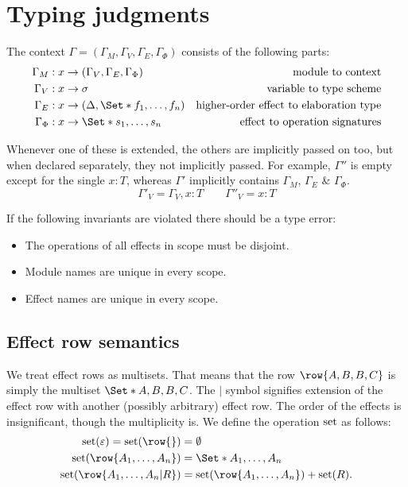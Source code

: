 \section{Typing judgments}

The context $\Gamma = (\Gamma_M, \Gamma_V, \Gamma_E, \Gamma_\Phi)$ consists of the following parts:
\begin{align*}
    \Gamma_M &: x \to (\Gamma_V, \Gamma_E, \Gamma_\Phi) & \text{module to context}\\
    \Gamma_V &: x \to \sigma & \text{variable to type scheme}\\
    \Gamma_E &: x \to (\Delta, \S{f_1, \dots, f_n}) & \text{higher-order effect to elaboration type}\\
    \Gamma_\Phi &: x \to \S{s_1,\dots,s_n} & \text{effect to operation signatures}
\end{align*}


Whenever one of these is extended, the others are implicitly passed on too, but when declared separately, they not implicitly passed. For example, $\Gamma''$ is empty except for the single $x: T$, whereas $\Gamma'$ implicitly contains $\Gamma_M$, $\Gamma_E$ \& $\Gamma_\Phi$.
\[ \Gamma'_V = \Gamma_V, x: T \qquad \Gamma''_V = x: T \]

If the following invariants are violated there should be a type error:

\begin{itemize}
    \item The operations of all effects in scope must be disjoint.
    \item Module names are unique in every scope.
    \item Effect names are unique in every scope.
\end{itemize}

\subsection{Effect row semantics}

We treat effect rows as multisets. That means that the row $\row{A, B, B, C}$ is simply the multiset $\S{A, B, B, C}$. The $|$ symbol signifies extension of the effect row with another (possibly arbitrary) effect row. The order of the effects is insignificant, though the multiplicity is. We define the operation $\operatorname{set}$ as follows:
\begin{align*}
    \set(\varepsilon) = \set(\row{}) &= \emptyset\\
    \set(\row{A_1, \dots, A_n}) &= \S{A_1, \dots, A_n}\\
    \set(\row{A_1, \dots, A_n|R}) &= \set(\row{A_1, \dots, A_n}) + \set(R).
\end{align*}

